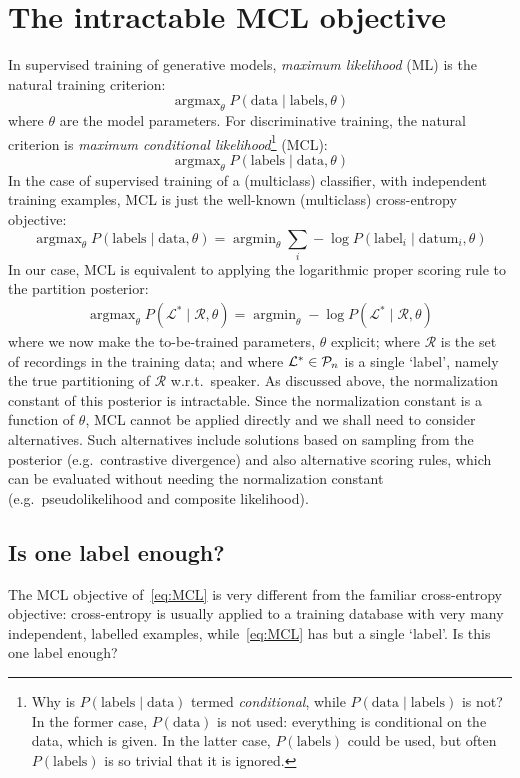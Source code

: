 \documentclass[a4paper,oneside,12pt,english]{report}
\DeclareMathOperator*{\argmax}{argmax}
\DeclareMathOperator*{\argmin}{argmin}
\def\Lset{\mathcal{L}}
\def\Rset{\mathcal{R}}
\begin{document}
\section{The intractable MCL objective}
\label{sec:MCL}
In supervised training of generative models, \emph{maximum likelihood} (ML) is the natural training criterion: 
$$\argmax_\theta P(\text{data}\mid\text{labels},\theta)$$
where $\theta$ are the model parameters. For discriminative training, the natural criterion is \emph{maximum conditional likelihood}\footnote{Why is $P(\text{labels}\mid\text{data})$ termed \emph{conditional}, while $P(\text{data}\mid\text{labels})$ is not? In the former case, $P(\text{data})$ is not used: everything is conditional on the data, which is given. In the latter case, $P(\text{labels})$ could be used, but often $P(\text{labels})$ is so trivial that it is ignored.} (MCL):
$$\argmax_\theta P(\text{labels}\mid\text{data},\theta)$$
In the case of supervised training of a (multiclass) classifier, with independent training examples, MCL is just the well-known (multiclass) cross-entropy objective:
$$\argmax_\theta P(\text{labels}\mid\text{data},\theta)=\argmin_\theta \sum_i -\log P(\text{label}_i\mid\text{datum}_i,\theta)$$
In our case, MCL is equivalent to applying the logarithmic proper scoring rule to the partition posterior: 
\begin{align}
\label{eq:MCL}
\argmax_\theta P(\Lset^*\mid\Rset,\theta)=\argmin_\theta -\log P(\Lset^*\mid\Rset,\theta)
\end{align}
where we now make the to-be-trained parameters, $\theta$ explicit; where $\Rset$ is the set of recordings in the training data; and where $\Lset^*\in\Pset_n$ is a single `label', namely the true partitioning of $\Rset$ w.r.t.\ speaker. As discussed above, the normalization constant of this posterior is intractable. Since the normalization constant is a function of $\theta$, MCL cannot be applied directly and we shall need to consider alternatives. Such alternatives include solutions based on sampling from the posterior (e.g.\ contrastive divergence) and also alternative scoring rules, which can be evaluated without needing the normalization constant (e.g.\ pseudolikelihood and composite likelihood). 

\subsection{Is one label enough?}
The MCL objective of~\eqref{eq:MCL} is very different from the familiar cross-entropy objective: cross-entropy is usually applied to a training database with very many independent, labelled examples, while~\eqref{eq:MCL} has but a single `label'. Is this one label enough?
\end{document}

